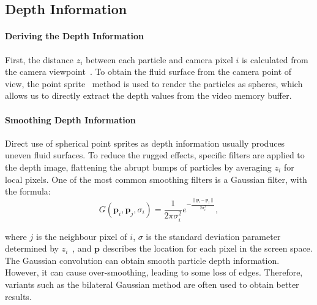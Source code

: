 \documentclass[times,twocolumn,final]{elsarticle}
\begin{document}
\subsection{Depth Information}

\paragraph{Deriving the Depth Information}
First, the distance $z_i$ between each particle and camera pixel $i$ is calculated from the camera viewpoint~\cite{ref:ref20}.
To obtain the fluid surface from the camera point of view, the point sprite~\cite{ref:ref21} method is used to render the particles as spheres, which allows us to directly extract the depth values from the video memory buffer.

\paragraph{Smoothing Depth Information}
Direct use of spherical point sprites as depth information usually produces uneven fluid surfaces. To reduce the rugged effects, specific filters are applied to the depth image, flattening the abrupt bumps of particles by averaging $z_i$ for local pixels. One of the most common smoothing filters is a Gaussian filter\cite{ref:ref24}, with the formula:
\begin{equation}
    G\left({\mathbf{p}}_i, {\mathbf{p}}_j, \sigma_i\right)
    =
    \frac{1}{2 \pi \sigma_i^{2}} e^{-\frac{ \| {\mathbf{p}}_i - {\mathbf{p}}_j \| }{2 \sigma_i^{2}}} , 
\label{con:equ2}
\end{equation}

where $j$ is the neighbour pixel of $i$, $\sigma$ is the standard deviation parameter determined by $z_i$~\cite{truong2018narrow}, and ${\mathbf{p}}$ describes the location for each pixel in the screen space. 
The Gaussian convolution can obtain smooth particle depth information. However, it can cause over-smoothing, leading to some loss of edges. Therefore, variants such as the bilateral Gaussian method are often used to obtain better results.
\end{document}
